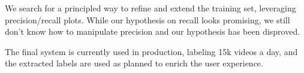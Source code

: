 We search for a principled way to refine and extend the training set, leveraging precision/recall plots. While our hypothesis on recall looks promising, we still don't know how to manipulate precision and our hypothesis has been disproved.

The final system is currently used in production, labeling 15k videos a day, and the extracted labels are used as planned to enrich the user experience.

